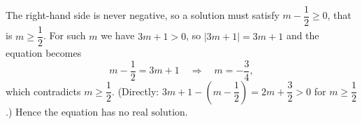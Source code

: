 The right-hand side is never negative, so a solution must satisfy $m-\dfrac{1}{2}\ge0$, that is $m\ge\dfrac{1}{2}$. For such $m$ we have $3m+1>0$, so $\left|3m+1\right|=3m+1$ and the equation becomes
\[
m-\dfrac{1}{2}=3m+1\quad\Longrightarrow\quad m=-\dfrac{3}{4} ,
\]
which contradicts $m\ge\dfrac{1}{2}$. (Directly: $3m+1-\left(m-\dfrac{1}{2}\right)=2m+\dfrac{3}{2}>0$ for $m\ge\dfrac{1}{2}$.) Hence the equation has $\boxed{\text{no real solution}}$.

